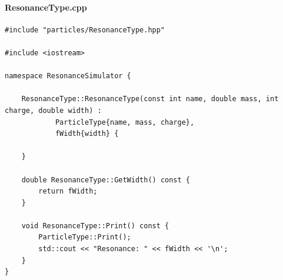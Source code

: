 \documentclass[12pt, a4paper]{article}
\begin{document}
\paragraph{ResonanceType.cpp}
\begin{verbatim}
#include "particles/ResonanceType.hpp"

#include <iostream>

namespace ResonanceSimulator {

    ResonanceType::ResonanceType(const int name, double mass, int charge, double width) :
            ParticleType{name, mass, charge},
            fWidth{width} {

    }

    double ResonanceType::GetWidth() const {
        return fWidth;
    }

    void ResonanceType::Print() const {
        ParticleType::Print();
        std::cout << "Resonance: " << fWidth << '\n';
    }
}
\end{verbatim}
\end{document}

